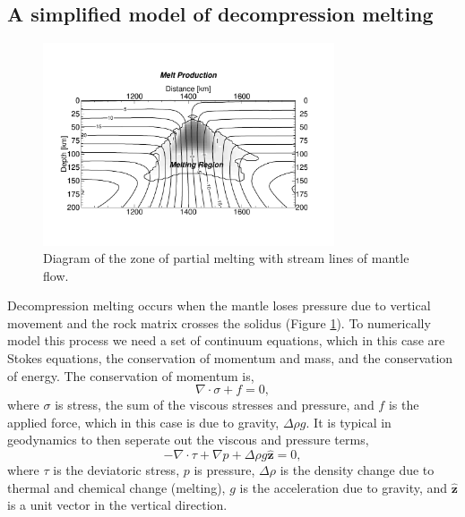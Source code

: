 \begin{subappendices}

\section{A simplified model of decompression melting}\label{app1}

\begin{figure}
\centering
\includegraphics[width=8.6cm]{./figures/ch2-melt-region.pdf}
\caption{Diagram of the zone of partial melting with stream lines of mantle flow.}
\label{fg:melt-region}
\end{figure}

Decompression melting occurs when the mantle loses pressure due to vertical movement and the rock matrix crosses the solidus (Figure \ref{fg:melt-region}). To numerically model this process we need a set of continuum equations, which in this case are Stokes equations, the conservation of momentum and mass, and the conservation of energy. The conservation of momentum is,
\begin{equation}
\nabla \cdot \sigma + f = 0,
\end{equation}
where $\sigma$ is stress, the sum of the viscous stresses and pressure, and $f$ is the applied force, which in this case is due to gravity, $\Delta\rho g$. It is typical in geodynamics to then seperate out the viscous and pressure terms,
\begin{equation}
- \nabla \cdot \tau + \nabla p + \Delta\rho g \hat{\mathbf{z}} = 0,
\label{eq:momentum}
\end{equation}
where $\tau$ is the deviatoric stress, $p$ is pressure, $\Delta\rho$ is the density change due to thermal and chemical change (melting), $g$ is the acceleration due to gravity, and $\hat{\mathbf{z}}$ is a unit vector in the vertical direction.


\end{subappendices}
